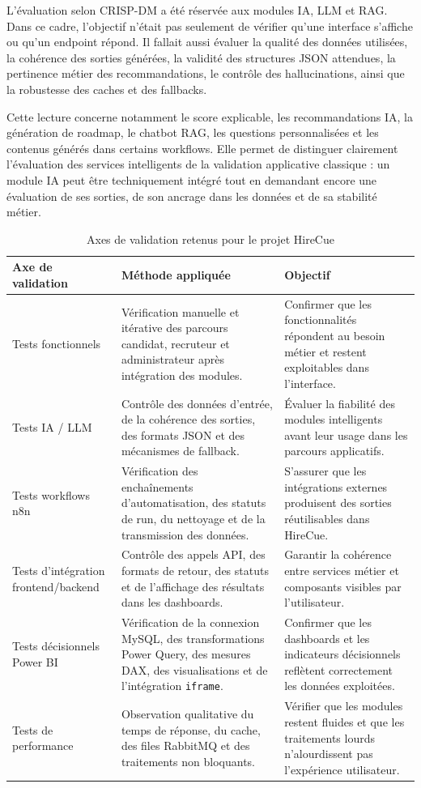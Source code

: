 L'évaluation selon CRISP-DM a été réservée aux modules IA, LLM et RAG. Dans ce cadre, l'objectif n'était pas seulement de vérifier qu'une interface s'affiche ou qu'un endpoint répond. Il fallait aussi évaluer la qualité des données utilisées, la cohérence des sorties générées, la validité des structures JSON attendues, la pertinence métier des recommandations, le contrôle des hallucinations, ainsi que la robustesse des caches et des fallbacks.

Cette lecture concerne notamment le score explicable, les recommandations IA, la génération de roadmap, le chatbot RAG, les questions personnalisées et les contenus générés dans certains workflows. Elle permet de distinguer clairement l'évaluation des services intelligents de la validation applicative classique : un module IA peut être techniquement intégré tout en demandant encore une évaluation de ses sorties, de son ancrage dans les données et de sa stabilité métier.

\begin{table}[H]
\centering
\small
\renewcommand{\arraystretch}{1.3}
\begin{tabular}{|p{3.7cm}|p{5.2cm}|p{5.2cm}|}
\hline
\rowcolor{headerblue}
\textbf{Axe de validation} & \textbf{Méthode appliquée} & \textbf{Objectif} \\
\hline
Tests fonctionnels & Vérification manuelle et itérative des parcours candidat, recruteur et administrateur après intégration des modules. & Confirmer que les fonctionnalités répondent au besoin métier et restent exploitables dans l'interface. \\
\hline
Tests IA / LLM & Contrôle des données d'entrée, de la cohérence des sorties, des formats JSON et des mécanismes de fallback. & Évaluer la fiabilité des modules intelligents avant leur usage dans les parcours applicatifs. \\
\hline
Tests workflows n8n & Vérification des enchaînements d'automatisation, des statuts de run, du nettoyage et de la transmission des données. & S'assurer que les intégrations externes produisent des sorties réutilisables dans HireCue. \\
\hline
Tests d'intégration frontend/backend & Contrôle des appels API, des formats de retour, des statuts et de l'affichage des résultats dans les dashboards. & Garantir la cohérence entre services métier et composants visibles par l'utilisateur. \\
\hline
Tests décisionnels Power BI & Vérification de la connexion MySQL, des transformations Power Query, des mesures DAX, des visualisations et de l'intégration \texttt{iframe}. & Confirmer que les dashboards et les indicateurs décisionnels reflètent correctement les données exploitées. \\
\hline
Tests de performance & Observation qualitative du temps de réponse, du cache, des files RabbitMQ et des traitements non bloquants. & Vérifier que les modules restent fluides et que les traitements lourds n'alourdissent pas l'expérience utilisateur. \\
\hline
\end{tabular}
\normalsize
\caption{Axes de validation retenus pour le projet HireCue}
\end{table}

